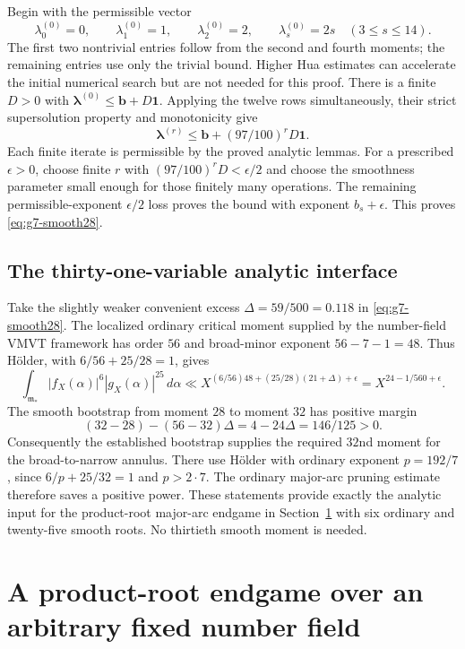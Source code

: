 \documentclass[11pt,reqno]{amsart}
\numberwithin{equation}{section}
\theoremstyle{definition}
\begin{document}
Begin with the permissible vector
\[
 \lambda_0^{(0)}=0,\qquad \lambda_1^{(0)}=1,\qquad
 \lambda_2^{(0)}=2,\qquad \lambda_s^{(0)}=2s\quad(3\le s\le14).
\]
The first two nontrivial entries follow from the second and fourth moments;
the remaining entries use only the trivial bound.  Higher Hua estimates can
accelerate the initial numerical search but are not needed for this proof.
There is a finite $D>0$ with
$\boldsymbol\lambda^{(0)}\le\boldsymbol b+D\mathbf1$.
Applying the twelve rows simultaneously, their strict supersolution property
and monotonicity give
\[
 \boldsymbol\lambda^{(r)}
 \le \boldsymbol b+(97/100)^rD\mathbf1.
\]
Each finite iterate is permissible by the proved analytic lemmas.
For a prescribed $\epsilon>0$, choose finite $r$ with
$(97/100)^rD<\epsilon/2$ and choose the smoothness parameter small enough
for those finitely many operations.  The remaining permissible-exponent
$\epsilon/2$ loss proves the bound with exponent $b_s+\epsilon$.
This proves \eqref{eq:g7-smooth28}.

\subsection{The thirty-one-variable analytic interface}

Take the slightly weaker convenient excess $\Delta=59/500=0.118$ in
\eqref{eq:g7-smooth28}.  The localized ordinary critical moment supplied by
the number-field VMVT framework has order $56$ and broad-minor exponent
$56-7-1=48$.  Thus H\"older, with
$6/56+25/28=1$, gives
\[
 \int_{\mathfrak m_*}|f_X(\alpha)|^6|g_X(\alpha)|^{25}\,d\alpha
 \ll X^{(6/56)48+(25/28)(21+\Delta)+\epsilon}
 =X^{24-1/560+\epsilon}.
\]
The smooth bootstrap from moment $28$ to moment $32$ has positive margin
\[
 (32-28)-(56-32)\Delta=4-24\Delta=146/125>0.
\]
Consequently the established bootstrap supplies the required $32$nd moment
for the broad-to-narrow annulus.  There use H\"older with ordinary exponent
$p=192/7$, since $6/p+25/32=1$ and $p>2\cdot7$.
The ordinary major-arc pruning estimate therefore saves a positive power.
These statements provide exactly the analytic input for the product-root major-arc endgame in Section~\ref{sec:product-endgame} with six ordinary and twenty-five smooth roots.
No thirtieth smooth moment is needed.


\section{A product-root endgame over an arbitrary fixed number field}
\label{sec:product-endgame}
\end{document}
